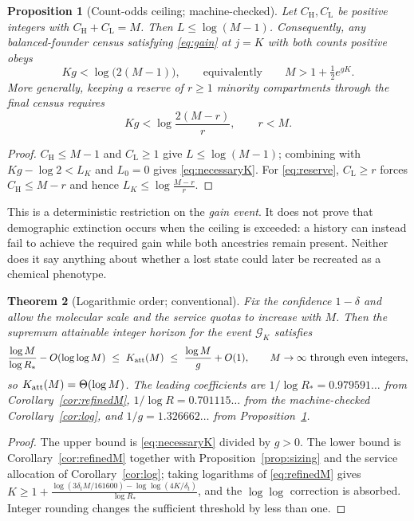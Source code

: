 \documentclass[11pt,a4paper]{article}
\theoremstyle{plain}
\newtheorem{theorem}{Theorem}[section]
\newtheorem{proposition}[theorem]{Proposition}
\theoremstyle{definition}
\theoremstyle{remark}
\newcommand{\lo}{\mathrm L}
\newcommand{\hi}{\mathrm H}
\begin{document}
\begin{proposition}[Count-odds ceiling; machine-checked]\label{prop:ceiling}
Let $C_\hi,C_\lo$ be positive integers with $C_\hi+C_\lo=M$. Then
$L\le\log(M-1)$. Consequently, any balanced-founder census satisfying
\eqref{eq:gain} at $j=K$ with both counts positive obeys
\begin{equation}\label{eq:necessaryK}
Kg<\log\bigl(2(M-1)\bigr),\qquad\text{equivalently}\qquad M>1+\tfrac12e^{gK}.
\end{equation}
More generally, keeping a reserve of $r\ge1$ minority compartments through the
final census requires
\begin{equation}\label{eq:reserve}
Kg<\log\frac{2(M-r)}{r},\qquad r<M .
\end{equation}
\end{proposition}

\begin{proof}
$C_\hi\le M-1$ and $C_\lo\ge1$ give $L\le\log(M-1)$; combining with
$Kg-\log2<L_K$ and $L_0=0$ gives \eqref{eq:necessaryK}. For \eqref{eq:reserve},
$C_\lo\ge r$ forces $C_\hi\le M-r$ and hence $L_K\le\log\frac{M-r}r$.
\end{proof}

This is a deterministic restriction on the \emph{gain event}. It does not prove
that demographic extinction occurs when the ceiling is exceeded: a history can
instead fail to achieve the required gain while both ancestries remain present.
Neither does it say anything about whether a lost state could later be
recreated as a chemical phenotype.

\begin{theorem}[Logarithmic order; conventional]\label{thm:order}
Fix the confidence $1-\delta$ and allow the molecular scale and the service
quotas to increase with $M$. Then the supremum attainable integer horizon for
the event $\mathcal G_K$ satisfies
\begin{equation}\label{eq:order}
\frac{\log M}{\log R_*}-O(\log\log M)\ \le\ K_{\rm att}(M)\ \le\
\frac{\log M}{g}+O(1),\qquad M\to\infty\ \text{through even integers},
\end{equation}
so $K_{\rm att}(M)=\Theta(\log M)$. The leading coefficients are
$1/\log R_*=0.979591\ldots$ from Corollary~\ref{cor:refinedM},
$1/\log R=0.701115\ldots$ from the machine-checked
Corollary~\ref{cor:log}, and $1/g=1.326662\ldots$ from
Proposition~\ref{prop:ceiling}.
\end{theorem}

\begin{proof}
The upper bound is \eqref{eq:necessaryK} divided by $g>0$. The lower bound is
Corollary~\ref{cor:refinedM} together with Proposition~\ref{prop:sizing} and
the service allocation of Corollary~\ref{cor:log}; taking logarithms of
\eqref{eq:refinedM} gives
$K\ge1+\frac{\log(3\delta_tM/161600)-\log\log(4K/\delta_t)}{\log R_*}$, and the
$\log\log$ correction is absorbed. Integer rounding changes the sufficient
threshold by less than one.
\end{proof}
\end{document}
